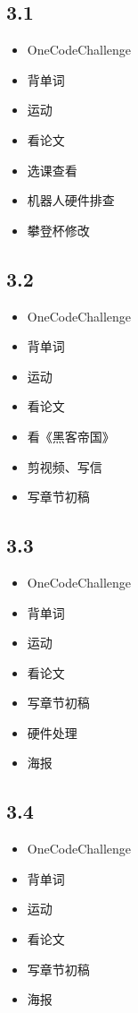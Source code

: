 \documentclass[UTF8]{ctexart}
\begin{document}
\subsection*{3.1}
\begin{itemize}
    \item OneCodeChallenge
    \item 背单词
    \item 运动
    \item 看论文
    \item 选课查看
    \item 机器人硬件排查
    \item 攀登杯修改
\end{itemize}

\subsection*{3.2}
\begin{itemize}
    \item OneCodeChallenge
    \item 背单词
    \item 运动
    \item 看论文
    \item 看《黑客帝国》
    \item 剪视频、写信
    \item 写章节初稿
\end{itemize}

\subsection*{3.3}
\begin{itemize}
    \item OneCodeChallenge
    \item 背单词
    \item 运动
    \item 看论文
    \item 写章节初稿
    \item 硬件处理
    \item 海报
\end{itemize}

\subsection*{3.4}
\begin{itemize}
    \item OneCodeChallenge
    \item 背单词
    \item 运动
    \item 看论文
    \item 写章节初稿
    \item 海报
\end{itemize}
\end{document}
